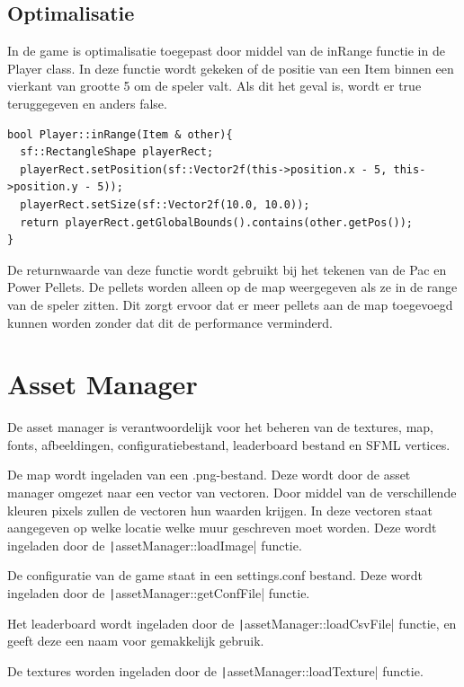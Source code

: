 \documentclass{report}
\begin{document}
    \subsection{Optimalisatie} %
    \label{sub:optimalisatie}
    In de game is optimalisatie toegepast door middel van de inRange functie in de Player class. In deze functie wordt gekeken of de positie van een Item binnen een vierkant van grootte 5 om de speler valt. Als dit het geval is, wordt er true teruggegeven en anders false.
    \begin{verbatim}
bool Player::inRange(Item & other){
  sf::RectangleShape playerRect;
  playerRect.setPosition(sf::Vector2f(this->position.x - 5, this->position.y - 5));
  playerRect.setSize(sf::Vector2f(10.0, 10.0));
  return playerRect.getGlobalBounds().contains(other.getPos());
}
    \end{verbatim}
    De returnwaarde van deze functie wordt gebruikt bij het tekenen van de Pac en Power Pellets. De pellets worden alleen op de map weergegeven als ze in de range van de speler zitten. Dit zorgt ervoor dat er meer pellets aan de map toegevoegd kunnen worden zonder dat dit de performance verminderd.

  \section{Asset Manager} %
  \label{sec:asset_manager}
  De asset manager is verantwoordelijk voor het beheren van de textures, map, fonts, afbeeldingen, configuratiebestand, leaderboard bestand en SFML vertices.

  De map wordt ingeladen van een .png-bestand. Deze wordt door de asset manager omgezet naar een vector van vectoren. Door middel van de verschillende kleuren pixels zullen de vectoren hun waarden krijgen. In deze vectoren staat aangegeven op welke locatie welke muur geschreven moet worden. Deze wordt ingeladen door de \texttt|assetManager::loadImage| functie.

  De configuratie van de game staat in een settings.conf bestand. Deze wordt ingeladen door de \texttt|assetManager::getConfFile| functie.

  Het leaderboard wordt ingeladen door de \texttt|assetManager::loadCsvFile| functie, en geeft deze een naam voor gemakkelijk gebruik.

  De textures worden ingeladen door de \texttt|assetManager::loadTexture| functie.
\end{document}

